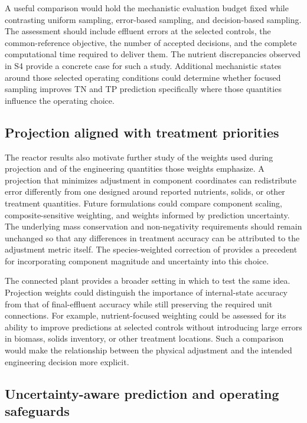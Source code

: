 A useful comparison would hold the mechanistic evaluation budget fixed while contrasting uniform sampling, error-based sampling, and decision-based sampling. The assessment should include effluent errors at the selected controls, the common-reference objective, the number of accepted decisions, and the complete computational time required to deliver them. The nutrient discrepancies observed in S4 provide a concrete case for such a study. Additional mechanistic states around those selected operating conditions could determine whether focused sampling improves TN and TP prediction specifically where those quantities influence the operating choice.

\subsection{Projection aligned with treatment priorities}

The reactor results also motivate further study of the weights used during projection and of the engineering quantities those weights emphasize. A projection that minimizes adjustment in component coordinates can redistribute error differently from one designed around reported nutrients, solids, or other treatment quantities. Future formulations could compare component scaling, composite-sensitive weighting, and weights informed by prediction uncertainty. The underlying mass conservation and non-negativity requirements should remain unchanged so that any differences in treatment accuracy can be attributed to the adjustment metric itself. The species-weighted correction of \citet{SturmSilva2024} provides a precedent for incorporating component magnitude and uncertainty into this choice.

The connected plant provides a broader setting in which to test the same idea. Projection weights could distinguish the importance of internal-state accuracy from that of final-effluent accuracy while still preserving the required unit connections. For example, nutrient-focused weighting could be assessed for its ability to improve predictions at selected controls without introducing large errors in biomass, solids inventory, or other treatment locations. Such a comparison would make the relationship between the physical adjustment and the intended engineering decision more explicit.

\subsection{Uncertainty-aware prediction and operating safeguards}

